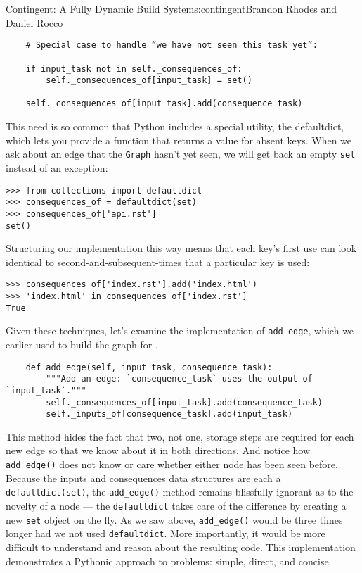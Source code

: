 \begin{aosachapter}{Contingent: A Fully Dynamic Build System}{s:contingent}{Brandon Rhodes and Daniel Rocco}
\begin{verbatim}
    # Special case to handle “we have not seen this task yet”:

    if input_task not in self._consequences_of:
        self._consequences_of[input_task] = set()

    self._consequences_of[input_task].add(consequence_task)
\end{verbatim}

This need is so common that Python includes a special utility, the
defaultdict, which lets you provide a function that returns a value for
absent keys. When we ask about an edge that the \texttt{Graph} hasn't
yet seen, we will get back an empty \texttt{set} instead of an
exception:

\begin{verbatim}
>>> from collections import defaultdict
>>> consequences_of = defaultdict(set)
>>> consequences_of['api.rst']
set()
\end{verbatim}

Structuring our implementation this way means that each key's first use
can look identical to second-and-subsequent-times that a particular key
is used:

\begin{verbatim}
>>> consequences_of['index.rst'].add('index.html')
>>> 'index.html' in consequences_of['index.rst']
True
\end{verbatim}

Given these techniques, let's examine the implementation of
\texttt{add\_edge}, which we earlier used to build the graph for
.

\begin{verbatim}
    def add_edge(self, input_task, consequence_task):
        """Add an edge: `consequence_task` uses the output of `input_task`."""
        self._consequences_of[input_task].add(consequence_task)
        self._inputs_of[consequence_task].add(input_task)
\end{verbatim}

This method hides the fact that two, not one, storage steps are required
for each new edge so that we know about it in both directions. And
notice how \texttt{add\_edge()} does not know or care whether either
node has been seen before. Because the inputs and consequences data
structures are each a \texttt{defaultdict(set)}, the
\texttt{add\_edge()} method remains blissfully ignorant as to the
novelty of a node --- the \texttt{defaultdict} takes care of the
difference by creating a new \texttt{set} object on the fly. As we saw
above, \texttt{add\_edge()} would be three times longer had we not used
\texttt{defaultdict}. More importantly, it would be more difficult to
understand and reason about the resulting code. This implementation
demonstrates a Pythonic approach to problems: simple, direct, and
concise.


\end{aosachapter}
